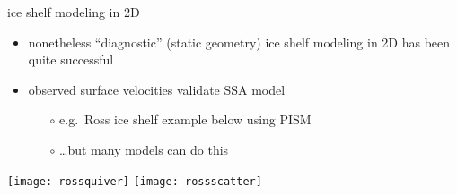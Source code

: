 \begin{frame}{ice shelf modeling in 2D}

\begin{itemize}
\item nonetheless ``diagnostic'' (static geometry) ice shelf modeling in 2D has been quite successful
\item observed surface velocities validate SSA model
  \begin{itemize}
  \item[$\circ$] e.g.~Ross ice shelf example below using PISM
  \item[$\circ$] \dots but many models can do this
  \end{itemize}
\end{itemize}

\begin{center}
  \texttt{[image: rossquiver]} \quad  \texttt{[image: rossscatter]}
\end{center}
\end{frame}

